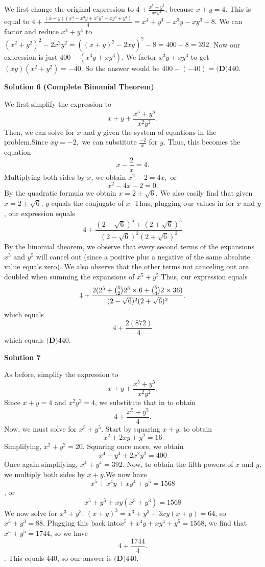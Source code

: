 \begin{enumerate}
 We first change the original expression to $4 + \frac{x^5 + y^5}{x^2 y^2}$, because $x + y = 4$. This is equal to $4 + \frac{(x + y)(x^4 - x^3 y + x^2 y^2 - x y^3 + y^4)}{4} = x^4 + y^4 - x^3 y - x y^3 + 8$. We can factor and reduce $x^4 + y^4$ to $(x^2 + y^2)^2 - 2 x^2 y^2 = ((x + y)^2 - 2xy)^2 - 8 = 400 - 8 = 392$. Now our expression is just $400 - (x^3 y + x y^3)$. We factor $x^3 y + x y^3$ to get $(xy)(x^2 + y^2) = -40$. So the answer would be $400 - (-40)  = \boxed{\textbf{(D)} 440}$.

 



\textbf{Solution 6 (Complete Binomial Theorem)}

We first simplify the expression to 
 \[x + y + \frac{x^5 + y^5}{x^2y^2}.\]Then, we can solve for $x$ and $y$ given the system of equations in the problem.Since $xy = -2,$ we can substitute $\frac{-2}{x}$ for $y$. Thus, this becomes the equation 
 \[x - \frac{2}{x} = 4.\]Multiplying both sides by $x$, we obtain $x^2 - 2 = 4x,$ or 
 \[x^2 - 4x - 2 = 0.\]By the quadratic formula we obtain $x = 2 \pm \sqrt{6}$. We also easily find that given $x = 2 \pm \sqrt{6}$, $y$ equals the conjugate of $x$. Thus, plugging our values in for $x$ and $y$, our expression equals
 \[4 + \frac{(2 - \sqrt{6})^5 + (2 + \sqrt{6})^5}{(2 - \sqrt{6})^2(2 + \sqrt{6})^2}\]By the binomial theorem, we observe that every second terms of the expansions $x^5$ and $y^5$ will cancel out (since a positive plus a negative of the same absolute value equals zero). We also observe that the other terms not canceling out are doubled when summing the expansions of $x^5 + y^5$.Thus, our expression equals
 \[4 + \frac{2(2^5 + \tbinom{5}{2}2^3 \times 6 + \tbinom{5}{4}2 \times 36)}{(2 - \sqrt{6})^2(2 + \sqrt{6})^2}.\]which equals
 \[4 + \frac{2(872)}{4}\]which equals $\boxed{\textbf{(D)} 440}$.

 



\textbf{Solution 7}

As before, simplify the expression to 
 \[x + y + \frac{x^5 + y^5}{x^2y^2}.\]Since $x + y = 4$ and $x^2y^2 = 4$, we substitute that in to obtain 
 \[4 + \frac{x^5 + y^5}{4}.\]Now, we must solve for $x^5 + y^5$. Start by squaring $x + y$, to obtain 
 \[x^2 + 2xy + y^2 = 16\]Simplifying, $x^2 + y^2 = 20$. Squaring once more, we obtain 
 \[x^4 + y^4 + 2x^2y^2 = 400\]Once again simplifying, $x^4 + y^4 = 392$. Now, to obtain the fifth powers of $x$ and $y$, we multiply both sides by $x + y$.We now have 
 \[x^5 + x^4y + xy^4 + y^5 = 1568\],                                                                                     or 
 \[x^5 + y^5 + xy(x^3 + y^3) = 1568\]We now solve for $x^3 + y^3$. $(x + y)^3=x^3 + y^3 + 3xy(x + y) = 64$, so $x^3 + y^3 = 88$. Plugging this back into$x^5 + x^4y + xy^4 + y^5 = 1568$, we find that $x^5 + y^5 = 1744$, so we have 
 \[4 + \frac{1744}{4}.\]. This equals 440, so our answer is $\boxed{\textbf{(D)} 440}$.


\end{enumerate}

